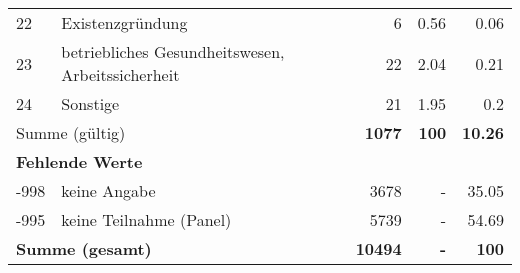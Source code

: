\begin{longtable}{lXrrr}
        22 & \multicolumn{1}{X}{Existenzgründung} & %
          \num{6} &
          \num[round-mode=places,round-precision=2]{0.56} &
          \num[round-mode=places,round-precision=2]{0.06} \\

        23 & \multicolumn{1}{X}{betriebliches Gesundheitswesen, Arbeitssicherheit} & %
          \num{22} &
          \num[round-mode=places,round-precision=2]{2.04} &
          \num[round-mode=places,round-precision=2]{0.21} \\

        24 & \multicolumn{1}{X}{Sonstige} & %
          \num{21} &
          \num[round-mode=places,round-precision=2]{1.95} &
          \num[round-mode=places,round-precision=2]{0.2} \\

     \midrule
     \multicolumn{2}{l}{Summe (gültig)} &
       \textbf{\num{1077}} &
     \textbf{\num{100}} &
       \textbf{\num[round-mode=places,round-precision=2]{10.26}} \\
     \multicolumn{5}{l}{\textbf{Fehlende Werte}}\\
       -998 &
       keine Angabe &
         \num{3678} &
        - &
         \num[round-mode=places,round-precision=2]{35.05} \\
       -995 &
       keine Teilnahme (Panel) &
         \num{5739} &
        - &
         \num[round-mode=places,round-precision=2]{54.69} \\
     \midrule
     \multicolumn{2}{l}{\textbf{Summe (gesamt)}} &
          \textbf{\num{10494}} &
        \textbf{-} &
        \textbf{\num{100}} \\
     \bottomrule
     \end{longtable}
     
